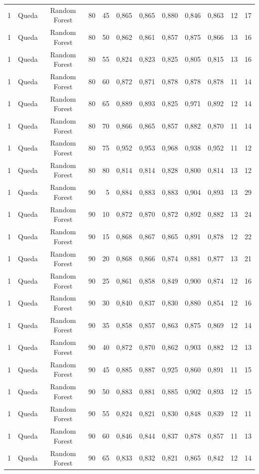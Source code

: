 \begin{longtable}{ccclrrrrrrrr}
1 & Queda & Random Forest & 80 & 45 & 0,865 & 0,865 & 0,880 & 0,846 & 0,863 & 12 & 17 \\
1 & Queda & Random Forest & 80 & 50 & 0,862 & 0,861 & 0,857 & 0,875 & 0,866 & 13 & 16 \\
1 & Queda & Random Forest & 80 & 55 & 0,824 & 0,823 & 0,825 & 0,805 & 0,815 & 13 & 16 \\
1 & Queda & Random Forest & 80 & 60 & 0,872 & 0,871 & 0,878 & 0,878 & 0,878 & 11 & 14 \\
1 & Queda & Random Forest & 80 & 65 & 0,889 & 0,893 & 0,825 & 0,971 & 0,892 & 12 & 14 \\
1 & Queda & Random Forest & 80 & 70 & 0,866 & 0,865 & 0,857 & 0,882 & 0,870 & 11 & 14 \\
1 & Queda & Random Forest & 80 & 75 & 0,952 & 0,953 & 0,968 & 0,938 & 0,952 & 11 & 12 \\
1 & Queda & Random Forest & 80 & 80 & 0,814 & 0,814 & 0,828 & 0,800 & 0,814 & 13 & 12 \\
1 & Queda & Random Forest & 90 & 5 & 0,884 & 0,883 & 0,883 & 0,904 & 0,893 & 13 & 29 \\
1 & Queda & Random Forest & 90 & 10 & 0,872 & 0,870 & 0,872 & 0,892 & 0,882 & 13 & 24 \\
1 & Queda & Random Forest & 90 & 15 & 0,868 & 0,867 & 0,865 & 0,891 & 0,878 & 12 & 22 \\
1 & Queda & Random Forest & 90 & 20 & 0,868 & 0,866 & 0,874 & 0,881 & 0,877 & 13 & 21 \\
1 & Queda & Random Forest & 90 & 25 & 0,861 & 0,858 & 0,849 & 0,900 & 0,874 & 12 & 16 \\
1 & Queda & Random Forest & 90 & 30 & 0,840 & 0,837 & 0,830 & 0,880 & 0,854 & 12 & 16 \\
1 & Queda & Random Forest & 90 & 35 & 0,858 & 0,857 & 0,863 & 0,875 & 0,869 & 12 & 14 \\
1 & Queda & Random Forest & 90 & 40 & 0,872 & 0,870 & 0,862 & 0,903 & 0,882 & 12 & 13 \\
1 & Queda & Random Forest & 90 & 45 & 0,885 & 0,887 & 0,925 & 0,860 & 0,891 & 11 & 15 \\
1 & Queda & Random Forest & 90 & 50 & 0,883 & 0,881 & 0,885 & 0,902 & 0,893 & 12 & 15 \\
1 & Queda & Random Forest & 90 & 55 & 0,824 & 0,821 & 0,830 & 0,848 & 0,839 & 12 & 11 \\
1 & Queda & Random Forest & 90 & 60 & 0,846 & 0,844 & 0,837 & 0,878 & 0,857 & 11 & 13 \\
1 & Queda & Random Forest & 90 & 65 & 0,833 & 0,832 & 0,821 & 0,865 & 0,842 & 12 & 14 \\

\end{longtable}
